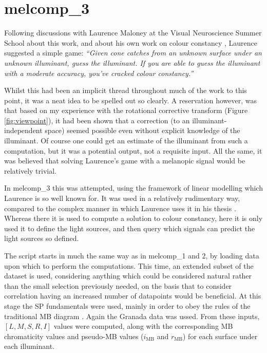 

\section{melcomp\_3}

Following discussions with Laurence Maloney at the Visual Neuroscience Summer School about this work, and about his own work on colour constancy \citep{maloney_computational_1984,maloney_color_1986}, Laurence suggested a simple game: \emph{``Given cone catches from an unknown surface under an unknown illuminant, guess the illuminant. If you are able to guess the illuminant with a moderate accuracy, you've cracked colour constancy.''}

Whilst this had been an implicit thread throughout much of the work to this point, it was a neat idea to be spelled out so clearly. A reservation however, was that based on my experience with the rotational corrective transform (Figure \ref{fig:viewpoint}), it had been shown that a correction (to an illuminant-independent space) seemed possible even without explicit knowledge of the illuminant. Of course one could get an estimate of the illuminant from such a computation, but it was a potential output, not a requisite input. All the same, it was believed that solving Laurence's game with a melanopic signal would be relatively trivial.

In melcomp\_3 this was attempted, using the framework of linear modelling which Laurence is so well known for. It was used in a relatively rudimentary way, compared to the complex manner in which Laurence uses it in his thesis \citep{maloney_computational_1984}. Whereas there it is used to compute a solution to colour constancy, here it is only used it to define the light sources, and then query which signals can predict the light sources so defined.

The script starts in much the same way as in melcomp\_1 and 2, by loading data upon which to perform the computations. This time, an extended subset of the \citet{vrhel_measurement_1994} dataset is used, considering anything which could be considered natural rather than the small selection previously needed, on the basis that to consider correlation having an increased number of datapoints would be beneficial. At this stage the \gls{SP} fundamentals were used, mainly in order to obey the rules of the traditional \gls{MB} diagram \citep{macleod_chromaticity_1979}. Again the Granada data \citep{hernandez-andres_color_2001} was ussed. From these inputs, $[L,M,S,R,I]$ values were computed, along with the corresponding \gls{MB} chromaticity values and pseudo-MB values ($i_{\text{MB}}$ and $r_{\text{MB}}$) for each surface under each illuminant.

